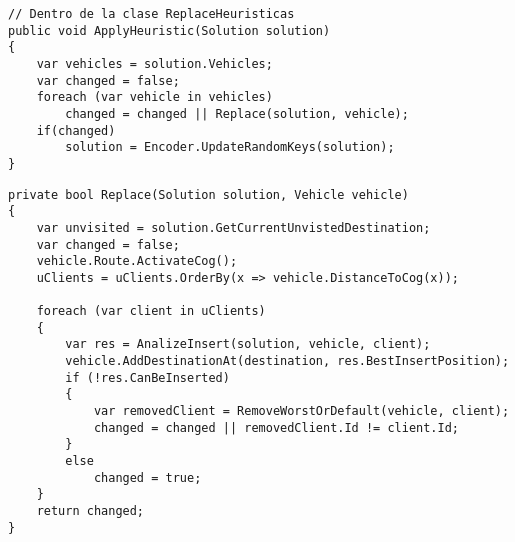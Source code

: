 \begin{minipage}{\textwidth}
\begin{lstlisting}
// Dentro de la clase ReplaceHeuristicas
public void ApplyHeuristic(Solution solution)
{	
	var vehicles = solution.Vehicles;
	var changed = false;	
	foreach (var vehicle in vehicles)
		changed = changed || Replace(solution, vehicle);
	if(changed)
		solution = Encoder.UpdateRandomKeys(solution);
}
\end{lstlisting}
\end{minipage}

\begin{minipage}{\textwidth}
\begin{lstlisting}
private bool Replace(Solution solution, Vehicle vehicle)
{
	var unvisited = solution.GetCurrentUnvistedDestination;
	var changed = false;
	vehicle.Route.ActivateCog();
	uClients = uClients.OrderBy(x => vehicle.DistanceToCog(x));	

	foreach (var client in uClients)
	{
		var res = AnalizeInsert(solution, vehicle, client);
		vehicle.AddDestinationAt(destination, res.BestInsertPosition);
		if (!res.CanBeInserted)
		{
			var removedClient = RemoveWorstOrDefault(vehicle, client);
			changed = changed || removedClient.Id != client.Id;
		}
		else
			changed = true;
	}
	return changed;
}
\end{lstlisting}
\end{minipage}

\bigskip


